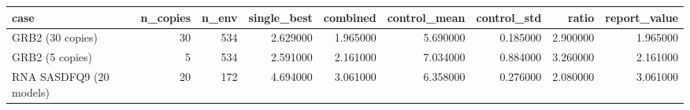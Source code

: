 \begin{tabular}{lrrrrrrrr}
\toprule
case & n\_copies & n\_env & single\_best & combined & control\_mean & control\_std & ratio & report\_value \\
\midrule
GRB2 (30 copies) & 30 & 534 & 2.629000 & 1.965000 & 5.690000 & 0.185000 & 2.900000 & 1.965000 \\
GRB2 (5 copies) & 5 & 534 & 2.591000 & 2.161000 & 7.034000 & 0.884000 & 3.260000 & 2.161000 \\
RNA SASDFQ9 (20 models) & 20 & 172 & 4.694000 & 3.061000 & 6.358000 & 0.276000 & 2.080000 & 3.061000 \\
\bottomrule
\end{tabular}
